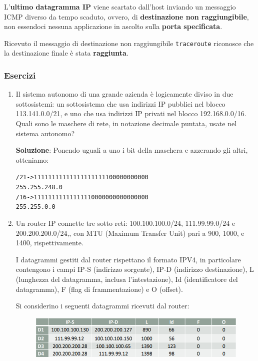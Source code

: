 \documentclass[11pt,a4paper,oneside]{book}
\theoremstyle{definition}
\begin{document}
\begin{itemize}
	      L'\textbf{ultimo datagramma IP} viene scartato dall'host inviando un messaggio ICMP diverso da tempo scaduto, ovvero, di \textbf{destinazione non raggiungibile}, non essendoci nessuna applicazione in ascolto sulla \textbf{porta specificata}.

	      Ricevuto il messaggio di destinazione non raggiungibile \texttt{traceroute} riconosce che la destinazione finale è stata \textbf{raggiunta}.

\end{itemize}

\subsubsection{Esercizi}
\begin{enumerate}
	\item Il sistema autonomo di una grande azienda è logicamente diviso in due sottosistemi: un sottosistema che usa indirizzi IP pubblici nel blocco 113.141.0.0/21, e uno che usa indirizzi IP privati nel blocco 192.168.0.0/16. Quali sono le maschere di rete, in notazione decimale puntata, usate nel sistema autonomo?

	      \textbf{Soluzione}: Ponendo uguali a uno i bit della maschera e azzerando gli altri, otteniamo:
	      \begin{alltt}
		      \centering
		      /21 -> 11111111 11111111 11111000 00000000
		      255.255. 248.0
		      /16 -> 11111111 11111111 00000000 00000000
		      255.255.0.0
	      \end{alltt}

	\item Un router IP connette tre sotto reti: 100.100.100.0/24, 111.99.99.0/24 e
	      200.200.200.0/24,, con MTU (Maximum Transfer Unit) pari a 900, 1000, e
	      1400, rispettivamente.

	      I datagrammi gestiti dal router rispettano il formato IPV4, in particolare
	      contengono i campi IP-S (indirizzo sorgente), IP-D (indirizzo destinazione), L
	      (lunghezza del datagramma, inclusa l’intestazione), Id (identificatore del
	      datagramma), F (flag di frammentazione) e O (offset).

	      Si considerino i seguenti datagrammi ricevuti dal router:
	      \begin{figure}[!h]
		      \includegraphics[scale=0.4]{Immagini/Ip_es2.png}
		      \centering
	      \end{figure}


\end{enumerate}
\end{document}
